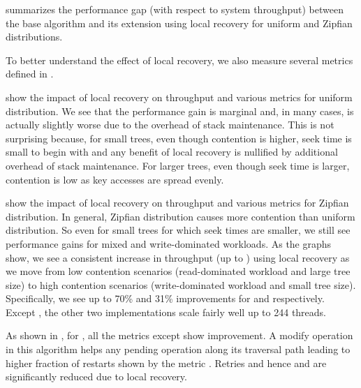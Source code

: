  summarizes the performance gap (with respect to system throughput) between the base algorithm and its extension using local recovery for uniform and Zipfian distributions. 


To better understand the effect of local recovery, we also measure several metrics defined in .

 show the impact of local recovery on throughput and various metrics for uniform distribution. We see that the performance gain is marginal and, in many cases, is actually slightly worse due to the overhead of stack maintenance. This is not surprising because, for small trees, even though contention is higher, seek time is small to begin with and any benefit of local recovery is nullified by additional overhead of stack maintenance. For larger trees, even though seek time is larger, contention is low as key accesses are spread evenly.



 show the impact of local recovery on throughput and various metrics for Zipfian distribution.  In general, Zipfian distribution causes more contention than uniform distribution. So even for small trees for which seek times are smaller, we still see performance gains for mixed and write-dominated workloads. As the graphs show,  we see a consistent increase in throughput (up to \localRecoveryMaximumgap{}) using local recovery as we move from low contention scenarios (read-dominated workload and large tree size)  to high contention scenarios (write-dominated workload and small tree size). Specifically, we see up to 70\% and 31\% improvements for \HJBST{} and \CASTLE{} respectively. Except \CITRUS{}, the other two implementations scale fairly well up to 244 threads.



As shown in , for \HJBST{}, all the metrics except \modifyTime{} show improvement.
A modify operation in this algorithm helps any pending operation along its traversal path leading to higher fraction of restarts shown by the metric \retries.
Retries and hence \seekLength{} and \seekTime{} are significantly reduced due to local recovery.

